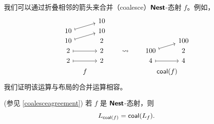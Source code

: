 我们可以通过折叠相邻的箭头来合并（coalesce）${\boldsymbol{\mathsf{Nest}}}$-态射 $f$。例如，
\[\begin{tikzcd}[row sep = 1, column sep = 8]
 & & 10 & & & & & & \\
 10 \ar[urr,mapsto] & & 10 & & & & & & \\
 10 \ar[urr,mapsto] & & 2 & & & & & & 100\\
 2 \ar[rr,mapsto] & & 2 & & \rightsquigarrow & & 100 \ar[urr,mapsto] & & 2\\
 2 \ar[rr,mapsto] & & 2 & & & & 4 \ar[rr,mapsto] & & 4\\
    & f & & & & & & \mathclap{\coalesce(f)} &
\end{tikzcd}\]
我们证明该运算与布局的合并运算相容。
\begin{mainthm}(参见 \ref{coalesceagreement}) 若 $f$ 是 ${\boldsymbol{\mathsf{Nest}}}$-态射，则
\[
L_{\mathsf{coal}(f)} = \mathsf{coal}(L_f).
\]
\end{mainthm}

